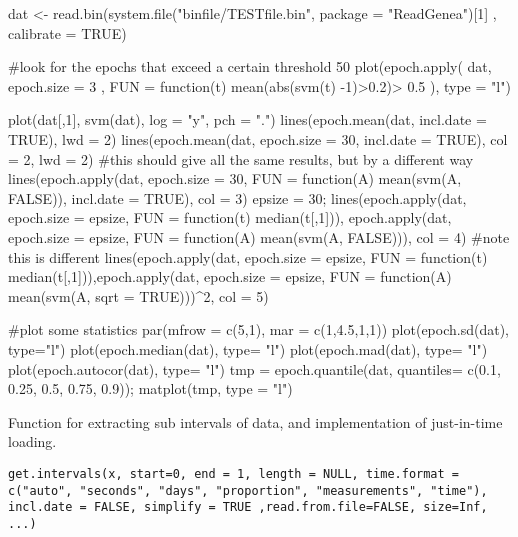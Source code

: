 \documentclass[a4paper]{book}
\begin{document}
%
\begin{Examples}
\begin{ExampleCode}

dat <- read.bin(system.file("binfile/TESTfile.bin", package = "ReadGenea")[1]
    , calibrate = TRUE)

#look for the epochs that exceed a certain threshold 50%
plot(epoch.apply( dat, epoch.size = 3 , 
    FUN = function(t) mean(abs(svm(t) -1)>0.2)> 0.5 ), type = "l")

plot(dat[,1], svm(dat), log = "y", pch = ".")
lines(epoch.mean(dat, incl.date = TRUE), lwd = 2)
lines(epoch.mean(dat, epoch.size = 30, incl.date = TRUE), col = 2, lwd = 2)
#this should give all the same results, but by a different way
lines(epoch.apply(dat, epoch.size = 30, 
    FUN = function(A) mean(svm(A, FALSE)), incl.date = TRUE), col = 3)
epsize = 30; lines(epoch.apply(dat, epoch.size = epsize, 
    FUN = function(t) median(t[,1])), epoch.apply(dat, epoch.size = epsize, 
    FUN = function(A) mean(svm(A, FALSE))), col = 4)
#note this is different
lines(epoch.apply(dat, epoch.size = epsize, 
    FUN = function(t) median(t[,1])),epoch.apply(dat, epoch.size = epsize, 
    FUN = function(A) mean(svm(A, sqrt = TRUE)))^2, col = 5)

#plot some statistics
par(mfrow = c(5,1), mar = c(1,4.5,1,1))
plot(epoch.sd(dat), type="l")
plot(epoch.median(dat), type= "l")
plot(epoch.mad(dat), type= "l")
plot(epoch.autocor(dat), type= "l")
tmp = epoch.quantile(dat, quantiles= c(0.1, 0.25, 0.5, 0.75, 0.9)); matplot(tmp, type = "l")


\end{ExampleCode}
\end{Examples}
%
\begin{Description}\relax
Function for extracting sub intervals of data, and implementation of just-in-time loading.
\end{Description}
%
\begin{Usage}
\begin{verbatim}
get.intervals(x, start=0, end = 1, length = NULL, time.format = c("auto", "seconds", "days", "proportion", "measurements", "time"), incl.date = FALSE, simplify = TRUE ,read.from.file=FALSE, size=Inf, ...)
\end{verbatim}
\end{Usage}
\end{document}
